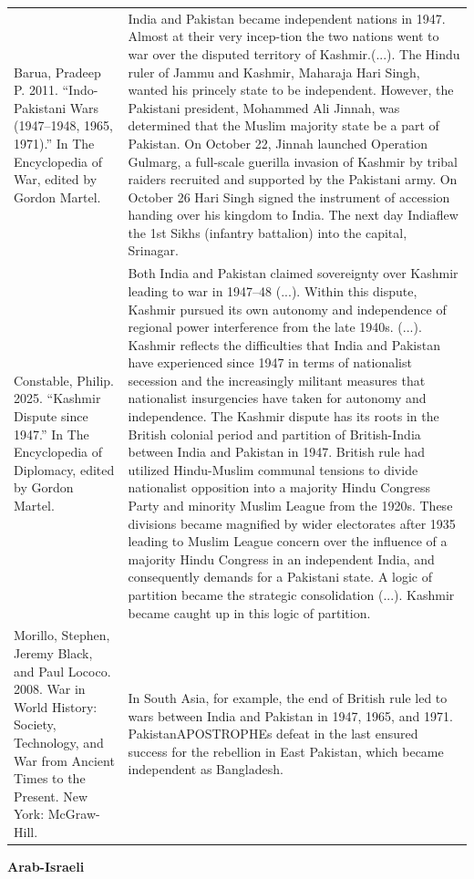 {\begin{longtable}{p{}p{}}
Barua, Pradeep P. 2011. “Indo-Pakistani Wars (1947–1948, 1965, 1971).” In The Encyclopedia of War, edited by Gordon Martel. & India and Pakistan became independent nations in 1947. Almost at their very incep-tion the two nations went to war over the disputed territory of Kashmir.(...).
The Hindu ruler of Jammu and Kashmir, Maharaja Hari Singh, wanted his princely state to be independent. However, the Pakistani president, Mohammed Ali Jinnah, was determined that the Muslim majority state be a part of Pakistan. On October 22, Jinnah launched Operation Gulmarg, a full-scale guerilla invasion of Kashmir by tribal raiders recruited and supported by the Pakistani army. On October 26 Hari Singh signed the instrument of accession handing over his kingdom to India. The next day Indiaflew the 1st Sikhs (infantry battalion) into the capital, Srinagar.
\\
Constable, Philip. 2025. “Kashmir Dispute since 1947.” In The Encyclopedia of Diplomacy, edited by Gordon Martel. & Both India and Pakistan claimed sovereignty over Kashmir leading to war in 1947–48 (...). Within this dispute, Kashmir pursued its own autonomy and independence of regional power interference from the late 1940s. (...). Kashmir reflects the difficulties that India and Pakistan have experienced since 1947 in terms of nationalist secession and the increasingly militant measures that nationalist insurgencies have taken for autonomy and independence. The Kashmir dispute has its roots in the British colonial period and partition of British-India between India and Pakistan in 1947. British rule had utilized Hindu-Muslim communal tensions to divide nationalist opposition into a majority Hindu Congress Party and minority Muslim League from the 1920s. These divisions became magnified by wider electorates after 1935 leading to Muslim League concern over the influence of a majority Hindu Congress in an independent India, and consequently demands for a Pakistani state. A logic of partition became the strategic consolidation (...). Kashmir became caught up in this logic of partition.
\\
Morillo, Stephen, Jeremy Black, and Paul Lococo. 2008. War in World History: Society, Technology, and War from Ancient Times to the Present. New York: McGraw-Hill. & In South Asia, for example, the end of British rule led to wars between India and Pakistan in 1947, 1965, and 1971. PakistanAPOSTROPHEs defeat in the last ensured success for the rebellion in East Pakistan, which became independent as Bangladesh.
\\
\end{longtable}}
\clearpage
         \textbf{Arab-Israeli} 

